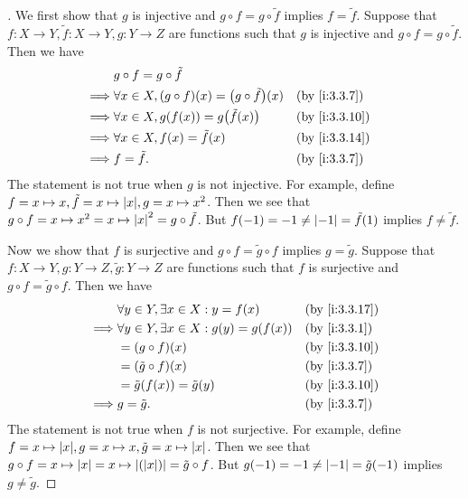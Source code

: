 \begin{proof}[]
  We first show that \(g\) is injective and \(g \circ f = g \circ \tilde{f}\) implies \(f = \tilde{f}\).
  Suppose that \(f : X \to Y, \tilde{f} : X \to Y, g : Y \to Z\) are functions such that \(g\) is injective and \(g \circ f = g \circ \tilde{f}\).
  Then we have
  \begin{align*}
             & g \circ f = g \circ \tilde{f}                                                  \\
    \implies & \forall x \in X, (g \circ f)(x) = \pa{g \circ \tilde{f}}(x) &  & \by{i:3.3.7}  \\
    \implies & \forall x \in X, g(f(x)) = g\pa{\tilde{f}(x)}               &  & \by{i:3.3.10} \\
    \implies & \forall x \in X, f(x) = \tilde{f}(x)                        &  & \by{i:3.3.14} \\
    \implies & f = \tilde{f}.                                              &  & \by{i:3.3.7}
  \end{align*}
  The statement is not true when \(g\) is not injective.
  For example, define \(f = x \mapsto x, \tilde{f} = x \mapsto \abs{x}, g = x \mapsto x^2\).
  Then we see that \(g \circ f = x \mapsto x^2 = x \mapsto \left\lvert x\right\rvert^2 = g \circ \tilde{f}\).
  But \(f(-1) = -1 \neq \left\lvert-1\right\rvert = \tilde{f}(1)\) implies \(f \neq \tilde{f}\).

  Now we show that \(f\) is surjective and \(g \circ f = \tilde{g} \circ f\) implies \(g = \tilde{g}\).
  Suppose that\(f : X \to Y, g : Y \to Z, \tilde{g} : Y \to Z\) are functions such that \(f\) is surjective and \(g \circ f = \tilde{g} \circ f\).
  Then we have
  \begin{align*}
             & \forall y \in Y, \exists x \in X : y = f(x)       &  & \by{i:3.3.17} \\
    \implies & \forall y \in Y, \exists x \in X : g(y) = g(f(x)) &  & \by{i:3.3.1}  \\
             & = (g \circ f)(x)                                  &  & \by{i:3.3.10} \\
             & = (\tilde{g} \circ f)(x)                          &  & \by{i:3.3.7}  \\
             & = \tilde{g}(f(x)) = \tilde{g}(y)                  &  & \by{i:3.3.10} \\
    \implies & g = \tilde{g}.                                    &  & \by{i:3.3.7}
  \end{align*}
  The statement is not true when \(f\) is not surjective.
  For example, define \(f = x \mapsto \abs{x}, g = x \mapsto x, \tilde{g} = x \mapsto \abs{x}\).
  Then we see that \(g \circ f = x \mapsto \left\lvert x\right\rvert = x \mapsto \left\lvert(\left\lvert x\right\rvert)\right\rvert = \tilde{g} \circ f\).
  But \(g(-1) = -1 \neq \left\lvert-1\right\rvert = \tilde{g}(-1)\) implies \(g \neq \tilde{g}\).
\end{proof}

